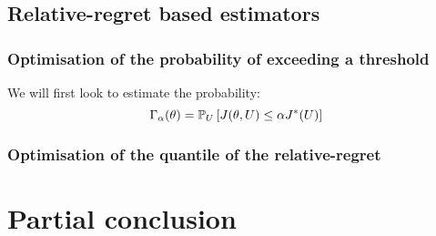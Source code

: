 \documentclass[../../Main_ManuscritThese.tex]{subfiles}
\newcommand\imgpath{/home/victor/acadwriting/Manuscrit/Text/Chapter5/img/}
\begin{document}

\subsection{Relative-regret based estimators}
\subsubsection{Optimisation of the probability of exceeding a threshold}
We will first look to estimate the probability:
\begin{equation}
  \Gamma_{\alpha}(\theta) = \mathbb{P}_{U}\left[J(\theta,U) \leq \alpha J^*(U)\right]
\end{equation}
\subsubsection{Optimisation of the quantile of the relative-regret}


\section{Partial conclusion}

%   
\end{document}
